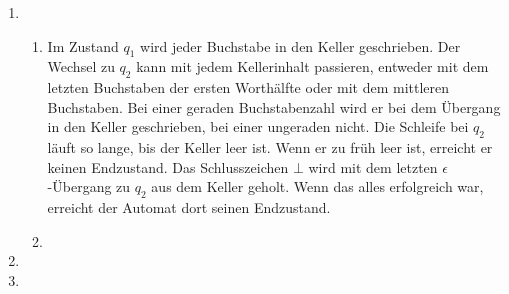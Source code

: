 \documentclass[a4paper]{scrartcl}
\title{\titleinfo}
\author{Arne Feil}
\date{\today}
\newcommand{\aufgabe}[1]{\item[\textbf{#1}]}
\begin{document}
\begin{enumerate}

\aufgabe{4.3}
\begin{enumerate}[1.]
 \item

Im Zustand $q_1$ wird jeder Buchstabe in den Keller geschrieben.
Der Wechsel zu $q_2$ kann mit jedem Kellerinhalt passieren, entweder mit dem letzten Buchstaben der ersten Worthälfte oder mit dem mittleren Buchstaben.
Bei einer geraden Buchstabenzahl wird er bei dem Übergang in den Keller geschrieben, bei einer ungeraden nicht.
Die Schleife bei $q_2$ läuft so lange, bis der Keller leer ist. Wenn er zu früh leer ist, erreicht er keinen Endzustand.
Das Schlusszeichen $\bot$ wird mit dem letzten $\epsilon$-Übergang zu $q_2$ aus dem Keller geholt. Wenn das alles erfolgreich war, erreicht der Automat dort seinen Endzustand.

\item


\end{enumerate}


\aufgabe{4.4}

\aufgabe{4.5}

\end{enumerate}
\end{document}
